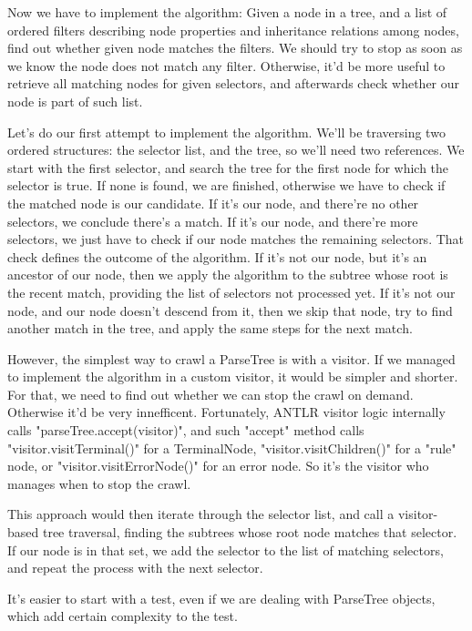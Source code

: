 \documentclass[11pt]{article}
\begin{document}
Now we have to implement the algorithm:
Given a node in a tree, and a list of ordered filters describing node properties and inheritance relations among nodes, find out whether
given node matches the filters.
We should try to stop as soon as we know the node does not match any filter. Otherwise, it'd be more useful to retrieve all matching
nodes for given selectors, and afterwards check whether our node is part of such list.

Let's do our first attempt to implement the algorithm. We'll be traversing two ordered structures: the selector list, and the tree, so we'll
need two references.
We start with the first selector, and search the tree for the first node for which the selector is true. If none is found, we are finished,
otherwise we have to check if the matched node is our candidate.
If it's our node, and there're no other selectors, we conclude there's a match.
If it's our node, and there're more selectors, we just have to check if our node matches the remaining selectors. That check defines the
outcome of the algorithm.
If it's not our node, but it's an ancestor of our node, then we apply the algorithm to the subtree whose root is the recent match, providing
the list of selectors not processed yet.
If it's not our node, and our node doesn't descend from it, then we skip that node, try to find another match in the tree, and apply the
same steps for the next match.

However, the simplest way to crawl a ParseTree is with a visitor. If we managed to implement the algorithm in a custom visitor, it
would be simpler and shorter. For that, we need to find out whether we can stop the crawl on demand. Otherwise it'd be very innefficent.
Fortunately, ANTLR visitor logic internally calls "parseTree.accept(visitor)", and such "accept" method calls "visitor.visitTerminal()"
for a TerminalNode, "visitor.visitChildren()" for a "rule" node, or "visitor.visitErrorNode()" for an error node. So it's the visitor
who manages when to stop the crawl.

This approach would then iterate through the selector list, and call a visitor-based tree traversal, finding the subtrees whose root
node matches that selector. If our node is in that set, we add the selector to the list of matching selectors, and repeat the
process with the next selector.

It's easier to start with a test, even if we are dealing with ParseTree objects, which add certain complexity to the test.
\end{document}
